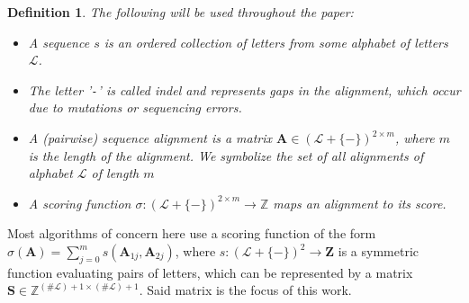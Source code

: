 \documentclass{article}
\newtheorem{definition}{Definition} \newtheorem{example}{Example}
\begin{document}
\begin{definition}
    The following will be used throughout the paper:
    \begin{itemize}
        \item A \emph{sequence} $s$ is an ordered collection of letters from
              some alphabet of letters $\mathcal{L}$.
        \item The letter '\texttt{-}' is called \emph{indel} and represents
              gaps in the alignment, which occur due to mutations or sequencing
              errors.
        \item A (pairwise) \emph{sequence alignment} is a matrix $\mathbf A \in
                  (\mathcal{L} + \{\mathtt{-}\})^{2 \times m}$, where $m$ is the
              length
              of the alignment. We symbolize the set of all alignments of
              alphabet $\mathcal L$ of length $m$
        \item A scoring function $\sigma: (\mathcal{L} + \{\mathtt{-}\})^{2
                      \times m} \to \mathbb{Z}$ maps an alignment to its score.
    \end{itemize}
\end{definition}
Most algorithms of concern here use a scoring function of the form
$\sigma(\mathbf A) = \sum_{j=0}^m s(\mathbf A_{1j}, \mathbf A_{2j})$, where $s:
    (\mathcal L + \{\mathtt{-}\})^2 \to \mathbf{Z}$ is a symmetric function
evaluating pairs of letters, which can be represented by a matrix $\mathbf S
    \in \mathbb Z^{(\# \mathcal L) + 1 \times (\# \mathcal L) + 1}$. Said matrix is
the focus of this work.
\end{document}
